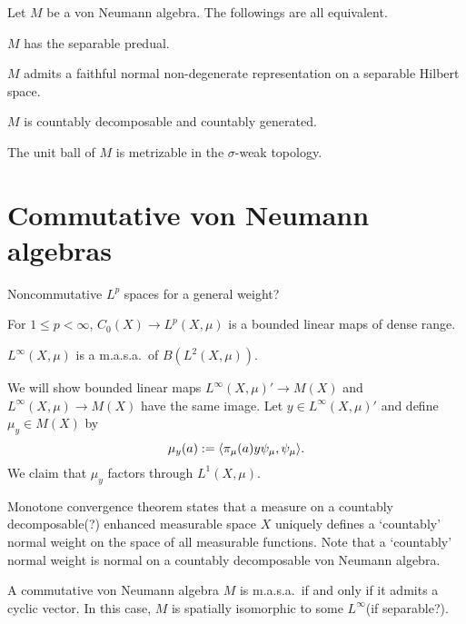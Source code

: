 \documentclass{../../large}
\begin{document}
\begin{prb}
Let $M$ be a von Neumann algebra.
The followings are all equivalent.
\begin{parts}
\item $M$ has the separable predual.
\item $M$ admits a faithful normal non-degenerate representation on a separable Hilbert space.
\item $M$ is countably decomposable and countably generated.
\item The unit ball of $M$ is metrizable in the $\sigma$-weak topology.
\end{parts}
\end{prb}
\begin{pf}
\end{pf}


\section{Commutative von Neumann algebras}

\begin{prb}
Noncommutative $L^p$ spaces for a general weight?
\begin{parts}
\item For $1\le p<\infty$, $C_0(X)\to L^p(X,\mu)$ is a bounded linear maps of dense range.
\item $L^\infty(X,\mu)$ is a m.a.s.a.~of $B(L^2(X,\mu))$.
\end{parts}
\end{prb}
\begin{pf}
We will show bounded linear maps $L^\infty(X,\mu)'\to M(X)$ and $L^\infty(X,\mu)\to M(X)$ have the same image.
Let $y\in L^\infty(X,\mu)'$ and define $\mu_y\in M(X)$ by
\[\mu_y(a):=\langle\pi_\mu(a)y\psi_\mu,\psi_\mu\rangle.\]
We claim that $\mu_y$ factors through $L^1(X,\mu)$.
\end{pf}

Monotone convergence theorem states that a measure on a countably decomposable(?) enhanced measurable space $X$ uniquely defines a `countably' normal weight on the space of all measurable functions.
Note that a `countably' normal weight is normal on a countably decomposable von Neumann algebra.



\begin{prb}
A commutative von Neumann algebra $M$ is m.a.s.a.~if and only if it admits a cyclic vector.
In this case, $M$ is spatially isomorphic to some $L^\infty$(if separable?).
\end{prb}
\begin{pf}
\end{pf}
\end{document}
